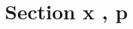 \documentclass{article}
\newcommand{\assignment}{Section x , p}
\begin{document}
\section*{\assignment}
\end{document}
